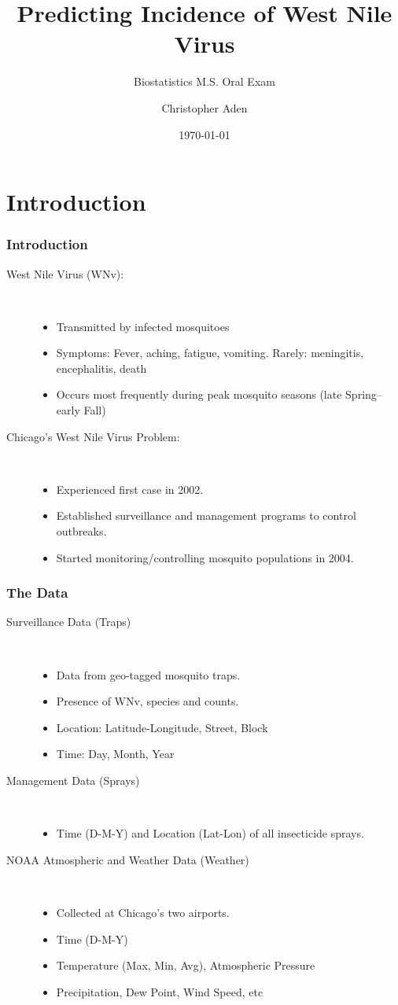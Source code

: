 \documentclass[handout]{beamer}
\title{Predicting Incidence of West Nile Virus}
\subtitle{Biostatistics M.S. Oral Exam}
\author{Christopher Aden}
\date{\today}
\begin{document}
\begin{frame}
\titlepage
\end{frame}

\section{Introduction}
\begin{frame}
\frametitle{Introduction}

\begin{description}
  \item[West Nile Virus (WNv):]\
    \begin{itemize}
      \item Transmitted by infected mosquitoes
      \item Symptoms: Fever, aching, fatigue, vomiting. Rarely: meningitis, encephalitis, death
      \item Occurs most frequently during peak mosquito seasons (late Spring--early Fall)
    \end{itemize}
  \item[Chicago's West Nile Virus Problem:]\
    \begin{itemize}
      \item Experienced first case in 2002.
      \item Established surveillance and management programs to control outbreaks.
	  \item Started monitoring/controlling mosquito populations in 2004.
    \end{itemize}
\end{description}
\end{frame}

\begin{frame}
\frametitle{The Data}
\begin{description}
\item[Surveillance Data (Traps)] \
\begin{itemize}
\item Data from geo-tagged mosquito traps.
\item Presence of WNv, species and counts.
\item Location: Latitude-Longitude, Street, Block
\item Time: Day, Month, Year
\end{itemize}
\item[Management Data (Sprays)]\
\begin{itemize}
\item Time (D-M-Y) and Location (Lat-Lon) of all insecticide sprays.
\end{itemize}
\item[NOAA Atmospheric and Weather Data (Weather)]\
\begin{itemize}
\item Collected at Chicago's two airports.
\item Time (D-M-Y)
\item Temperature (Max, Min, Avg), Atmospheric Pressure
\item Precipitation, Dew Point, Wind Speed, etc
\end{itemize}
\end{description}
\end{frame}
\end{document}
